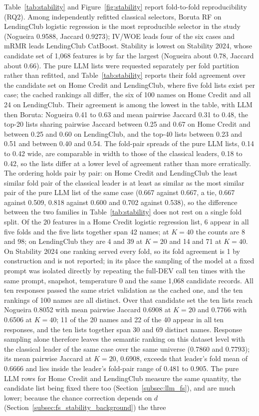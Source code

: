 \documentclass[final,5p,twocolumn]{elsarticle}
\newcommand{\Kfeat}{K}
\begin{document}
Table~\ref{tab:stability} and Figure~\ref{fig:stability} report fold-to-fold reproducibility (RQ2). Among independently refitted classical selectors, Boruta RF on LendingClub logistic regression is the most reproducible selector in the study (Nogueira 0.9588, Jaccard 0.9273); IV/WOE leads four of the six cases and mRMR leads LendingClub CatBoost. Stability is lowest on Stability 2024, whose candidate set of 1,068 features is by far the largest (Nogueira about 0.78, Jaccard about 0.66). The pure LLM lists were requested separately per fold partition rather than refitted, and Table~\ref{tab:stability} reports their fold agreement over the candidate set on Home Credit and LendingClub, where five fold lists exist per case; the cached rankings all differ, the six of 100 names on Home Credit and all 24 on LendingClub. Their agreement is among the lowest in the table, with LLM then Boruta: Nogueira 0.41 to 0.63 and mean pairwise Jaccard 0.31 to 0.48, the top-20 lists sharing pairwise Jaccard between 0.25 and 0.67 on Home Credit and between 0.25 and 0.60 on LendingClub, and the top-40 lists between 0.23 and 0.51 and between 0.40 and 0.54. The fold-pair spreads of the pure LLM lists, 0.14 to 0.42 wide, are comparable in width to those of the classical leaders, 0.18 to 0.42, so the lists differ at a lower level of agreement rather than more erratically. The ordering holds pair by pair: on Home Credit and LendingClub the least similar fold pair of the classical leader is at least as similar as the most similar pair of the pure LLM list of the same case (0.667 against 0.667, a tie, 0.667 against 0.509, 0.818 against 0.600 and 0.702 against 0.538), so the difference between the two families in Table~\ref{tab:stability} does not rest on a single fold split. Of the 20 features in a Home Credit logistic regression list, 6 appear in all five folds and the five lists together span 42 names; at $\Kfeat=40$ the counts are 8 and 98; on LendingClub they are 4 and 39 at $\Kfeat=20$ and 14 and 71 at $\Kfeat=40$. On Stability 2024 one ranking served every fold, so its fold agreement is 1 by construction and is not reported; in its place the sampling of the model at a fixed prompt was isolated directly by repeating the full-DEV call ten times with the same prompt, snapshot, temperature 0 and the same 1,068 candidate records. All ten responses passed the same strict validation as the cached one, and the ten rankings of 100 names are all distinct. Over that candidate set the ten lists reach Nogueira 0.8052 with mean pairwise Jaccard 0.6908 at $\Kfeat=20$ and 0.7766 with 0.6506 at $\Kfeat=40$; 11 of the 20 names and 22 of the 40 appear in all ten responses, and the ten lists together span 30 and 69 distinct names. Response sampling alone therefore leaves the semantic ranking on this dataset level with the classical leader of the same case over the same universe (0.7860 and 0.7793); its mean pairwise Jaccard at $\Kfeat=20$, 0.6908, exceeds that leader's fold mean of 0.6666 and lies inside the leader's fold-pair range of 0.481 to 0.905. The pure LLM rows for Home Credit and LendingClub measure the same quantity, the candidate list being fixed there too (Section~\ref{subsec:llm_fs}), and are much lower; because the chance correction depends on $d$ (Section~\ref{subsec:fs_stability_background}) the three 
\end{document}
